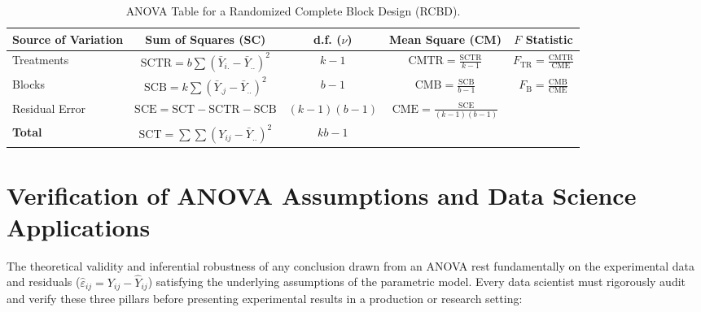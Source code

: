 \begin{table}[h!]
	\centering
	\begin{tabular}{lcccc}
		\hline
		\textbf{Source of Variation} & \textbf{Sum of Squares (SC)} & \textbf{d.f. ($\nu$)} & \textbf{Mean Square (CM)} & \textbf{$F$ Statistic} \\ \hline
		Treatments & $\text{SCTR} = b \sum (\bar{Y}_{i.} - \bar{Y}_{..})^2$ & $k - 1$ & $\text{CMTR} = \frac{\text{SCTR}}{k-1}$ & $F_{\text{TR}} = \frac{\text{CMTR}}{\text{CME}}$ \\
		Blocks & $\text{SCB} = k \sum (\bar{Y}_{.j} - \bar{Y}_{..})^2$ & $b - 1$ & $\text{CMB} = \frac{\text{SCB}}{b-1}$ & $F_{\text{B}} = \frac{\text{CMB}}{\text{CME}}$ \\
		Residual Error & $\text{SCE} = \text{SCT} - \text{SCTR} - \text{SCB}$ & $(k-1)(b-1)$ & $\text{CME} = \frac{\text{SCE}}{(k-1)(b-1)}$ & \\ \hline
		\textbf{Total} & $\text{SCT} = \sum \sum (Y_{ij} - \bar{Y}_{..})^2$ & $kb - 1$ & & \\ \hline
	\end{tabular}
	\caption{ANOVA Table for a Randomized Complete Block Design (RCBD).}
	\label{tab:anova_dbca}
\end{table}

\section{Verification of ANOVA Assumptions and Data Science Applications}

The theoretical validity and inferential robustness of any conclusion drawn from an ANOVA rest fundamentally on the experimental data and residuals ($\hat{\varepsilon}_{ij} = Y_{ij} - \hat{Y}_{ij}$) satisfying the underlying assumptions of the parametric model. Every data scientist must rigorously audit and verify these three pillars before presenting experimental results in a production or research setting:

